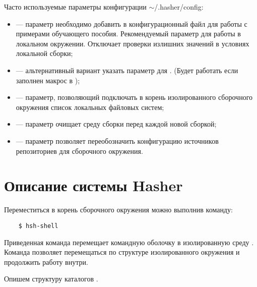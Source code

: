 Часто используемые параметры конфигурации $\sim$/.hasher/config:
\begin{itemize}
	\item {} ---  параметр необходимо  добавить в конфигурационный
	файл для работы с примерами обучающего пособия. Рекомендуемый параметр для работы в локальном
	окружении. Отключает проверки излишних значений в условиях локальной сборки;
	\item {} --- альтернативный вариант указать параметр  для .
	(Будет работать если заполнен макрос   в );
	\item {} --- параметр, позволяющий подключать в корень изолированного сборочного
	окружения список локальных файловых систем;
	\item {} --- параметр очищает среду сборки перед каждой новой сборкой;
	\item {} --- параметр позволяет переобозначить конфигурацию источников
	репозиториев для сборочного окружения.
\end{itemize}

\hypertarget{5.2}{\section{Описание системы Hasher}}
Переместиться в корень сборочного окружения можно выполнив команду:
\begin{verbatim}
	$ hsh-shell
\end{verbatim}
Приведенная команда перемещает командную оболочку в изолированную среду .
Команда позволяет перемещаться по структуре изолированного окружения и продолжить работу
внутри.

Опишем структуру каталогов .

